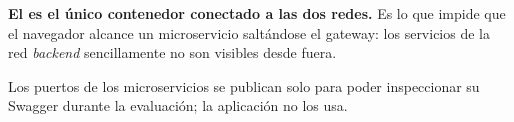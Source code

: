 \textbf{El  es el único contenedor conectado a las dos redes.} Es
lo que impide que el navegador alcance un microservicio saltándose el gateway:
los servicios de la red \emph{backend} sencillamente no son visibles desde
fuera.

Los puertos de los microservicios se publican solo para poder inspeccionar su
Swagger durante la evaluación; la aplicación no los usa.
